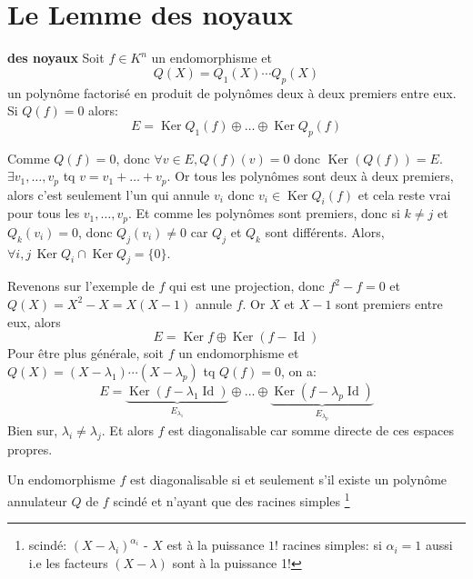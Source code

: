 \section{Le Lemme des noyaux}
\begin{lemma}\label{lemma:lemme-des-noyaux} \textbf{des noyaux}
   Soit $f \in K^n$ un endomorphisme et 
   \[
   Q(X) = Q_1(X) \cdots Q_p(X)
   \] 
   un polynôme factorisé en produit de polynômes deux à deux premiers entre eux. Si $Q(f) = 0$ alors:
    \[
        E = \operatorname{Ker} Q_1(f) \oplus \ldots \oplus \operatorname{Ker} Q_p(f)
   \] 
\end{lemma}
\begin{intuition}
    Comme $Q(f) = 0$, donc  $\forall v \in E, Q(f)(v) = 0$ donc
    $\operatorname{Ker}(Q(f)) = E$. $\exists v_1, \ldots, v_p$ tq $v = v_1 +
    \ldots + v_p$. Or tous les polynômes sont deux à deux premiers, alors c'est
    seulement l'un qui annule $v_i$ donc  $v_i \in \operatorname{Ker}Q_i(f)$ et
    cela reste vrai pour tous les $v_1, \ldots, v_p$. Et comme les polynômes
    sont premiers, donc si $k \neq j$ et $Q_k(v_i) = 0$, donc  $Q_j(v_i) \neq
    0$ car $Q_j$ et  $Q_k$ sont différents. Alors,  $\forall i, j \,
    \operatorname{Ker}Q_i \cap \operatorname{Ker}Q_j = \{0\}$.
\end{intuition}
\begin{remark}
   Revenons sur l'exemple de $f$ qui est une projection, donc  $f^2 - f = 0$ et  $Q(X) = X^2 - X = X(X-1)$ annule $f$. Or  $X$ et  $X-1$ sont premiers entre eux, alors 
    \[
        E = \operatorname{Ker}f \oplus \operatorname{Ker}(f - \operatorname{Id})
   \] 
    Pour être plus générale, soit $f$ un endomorphisme et $Q(X) = (X - \lambda_1) \cdots (X - \lambda_p)$ tq $Q(f) = 0$, on a:
     \[
         E = \underbrace{\operatorname{Ker}(f - \lambda_1 \operatorname{Id})}_{E_{\lambda_1}} \oplus \ldots \oplus \underbrace{\operatorname{Ker}(f - \lambda_p \operatorname{Id})}_{E_{\lambda_p}}
    \] 
    Bien sur, $\lambda_i \neq \lambda_j$. Et alors $f$ est diagonalisable car somme directe de ces espaces propres.
\end{remark}
\begin{corollary}
    Un endomorphisme $f$ est diagonalisable si et seulement s'il existe un polynôme annulateur  $Q$ de  $f$ scindé et n'ayant que des racines simples \footnote{scindé: $(X - \lambda_i)^{\alpha_i}$ - $X$ est à la puissance  $1$! racines simples: si  $\alpha_i = 1$ aussi i.e les facteurs  $(X - \lambda)$ sont à la puissance 1!} 
\end{corollary}
